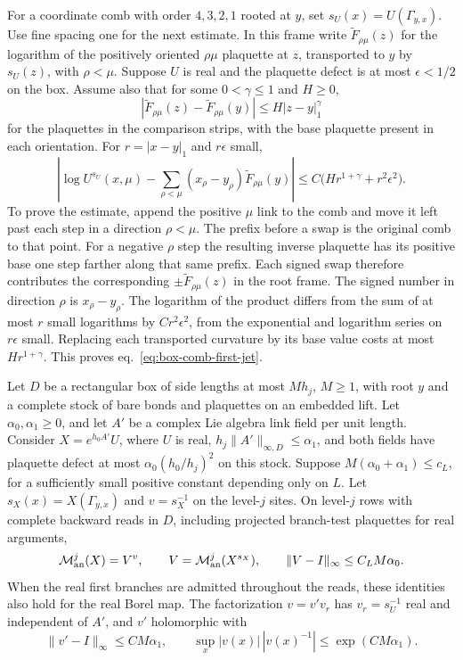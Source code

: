 \documentclass[11pt,letterpaper,reqno]{amsart}
\makeatletter
\numberwithin{equation}{section}
\renewcommand{\eqref}[1]{\textup{eq.~\ref{#1}}}
\theoremstyle{definition}
\newcommand{\ms@minorstart}{%
  \pushQED{\qed}\renewcommand{\qedsymbol}{$\blacksquare$}}
\newenvironment{proposition}[1][]{\ms@minorstart\ms@proposition[#1]}
  {\popQED\endms@proposition}
\theoremstyle{remark}
\makeatother
\begin{document}
For a coordinate comb with order $4,3,2,1$ rooted at $y$, set
$s_U(x)=U(\Gamma_{y,x})$. Use fine spacing one for the next estimate.
In this frame write $\widetilde F_{\rho\mu}(z)$ for the logarithm of
the positively oriented $\rho\mu$ plaquette at $z$, transported to
$y$ by $s_U(z)$, with $\rho<\mu$. Suppose $U$ is real and the
plaquette defect is at most $\epsilon<1/2$ on the box. Assume also that
for some $0<\gamma\le1$ and $H\ge0$,
\[
 |\widetilde F_{\rho\mu}(z)-\widetilde F_{\rho\mu}(y)|
       \le H|z-y|_1^\gamma
\]
for the plaquettes in the comparison strips, with the base plaquette
present in each orientation. For $r=|x-y|_1$ and $r\epsilon$ small,
\begin{equation}\label{eq:box-comb-first-jet}
 \left|\log U^{s_U}(x,\mu)-
          \sum_{\rho<\mu}(x_\rho-y_\rho)\widetilde F_{\rho\mu}(y)\right|
    \le C\bigl(Hr^{1+\gamma}+r^2\epsilon^2\bigr).
\end{equation}
To prove the estimate, append the positive $\mu$ link to the comb
and move it left past each step in a direction $\rho<\mu$. The
prefix before a swap is the original comb to that point. For a
negative $\rho$ step the resulting inverse plaquette has its
positive base one step farther along that same prefix. Each signed
swap therefore contributes the corresponding
$\pm\widetilde F_{\rho\mu}(z)$ in the root frame. The signed number
in direction $\rho$ is $x_\rho-y_\rho$. The logarithm of the product
differs from the sum of at most $r$ small logarithms by
$C r^2\epsilon^2$, from the exponential and logarithm series on
$r\epsilon$ small. Replacing each transported curvature by its base
value costs at most $Hr^{1+\gamma}$. This proves
\eqref{eq:box-comb-first-jet}.

\begin{proposition}[Bounded-box complex frame]\label{prop:box-complex-frame}
Let $D$ be a rectangular box of side lengths at most $Mh_j$, $M\ge1$, with
root $y$ and a complete stock of bare bonds and plaquettes on an
embedded lift. Let \(\alpha_0,\alpha_1\ge0\), and let \(A'\)
be a complex Lie algebra link field
per unit length. Consider $X=e^{h_0A'}U$, where $U$ is real,
$h_j\|A'\|_{\infty,D}\le\alpha_1$, and both fields have plaquette
defect at most $\alpha_0(h_0/h_j)^2$ on this stock. Suppose
\(M(\alpha_0+\alpha_1)\le c_L\), for a sufficiently small
positive constant depending only on \(L\). Let
$s_X(x)=X(\Gamma_{y,x})$ and $v=s_X^{-1}$ on the level-$j$ sites.
On level-$j$ rows with complete backward reads in $D$, including
projected branch-test plaquettes for real arguments,
\begin{equation}\label{eq:box-complex-frame}
 \mathcal M_{\rm an}^j(X)=V^v,\qquad
 V=\mathcal M_{\rm an}^j(X^{s_X}),\qquad
 \|V-I\|_\infty\le C_L M\alpha_0.
\end{equation}
When the real first branches are admitted throughout the reads,
these identities also hold for the real Borel map.
The factorization $v=v'v_r$ has $v_r=s_U^{-1}$ real and independent
of $A'$, and $v'$ holomorphic with
\[
 \|v'-I\|_\infty\le C M\alpha_1,\qquad
 \sup_x|v(x)|\,|v(x)^{-1}|\le \exp(CM\alpha_1).
\]
\end{proposition}
\end{document}
